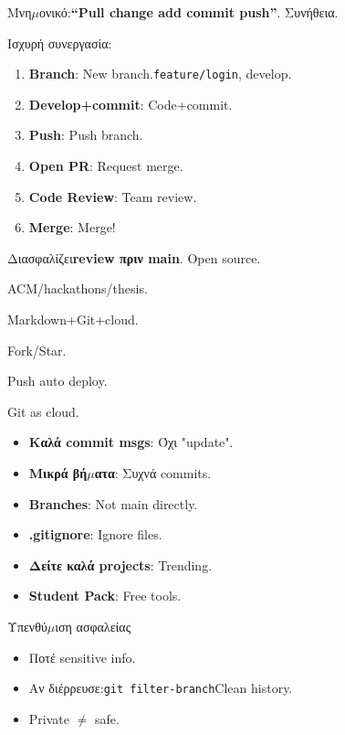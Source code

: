 Μνη$\mu$ονικό:\textbf{“Pull change add commit push”}. Συνήθεια.


Ισχυρή συνεργασία:

\begin{enumerate}
  \item \textbf{Branch}: New branch.\texttt{feature/\allowbreak login}, develop.
  \item \textbf{Develop+commit}: Code+commit.
  \item \textbf{Push}: Push branch.
  \item \textbf{Open PR}: Request merge.
  \item \textbf{Code Review}: Team review.
  \item \textbf{Merge}: Merge!
\end{enumerate}

Διασφαλίζει\textbf{review πριν main}. Open source.



ACM/hackathons/thesis.


Markdown+Git+cloud.


Fork/Star.


Push auto deploy.


Git as cloud.


\begin{itemize}
  \item \textbf{Καλά commit msgs}: Όχι "update".
  \item \textbf{Μικρά βή$\mu$ατα}: Συχνά commits.
  \item \textbf{Branches}: Not main directly.
  \item \textbf{.gitignore}: Ignore files.
  \item \textbf{Δείτε καλά projects}: Trending.
  \item \textbf{Student Pack}: Free tools.
\end{itemize}

\begin{tcbwarn}{Υπενθύ$\mu$ιση ασφαλείας}
\begin{itemize}
  \item Ποτέ sensitive info.
  \item Αν διέρρευσε:\texttt{git filter-\allowbreak branch}Clean history.
  \item Private $\neq$ safe.
\end{itemize}

\end{tcbwarn}

